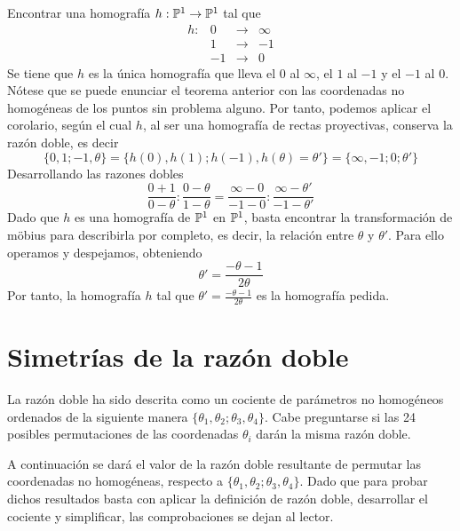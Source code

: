 \begin{exa}
	Encontrar una homografía $h:\mathbb{P}^1\rightarrow \mathbb{P}^1$ tal que 
	\begin{equation*}
		\begin{array}{cccc}
		h:&0&\rightarrow &\infty\\
		&1&\rightarrow &-1\\
		&-1&\rightarrow &0
		\end{array}
	\end{equation*}
	Se tiene que $h$ es la única homografía que lleva el $0$ al $\infty$, el $1$ al $-1$ y el $-1$ al $0$. Nótese que se puede enunciar el teorema anterior con las coordenadas no homogéneas de los puntos sin problema alguno. Por tanto, podemos aplicar el corolario, según el cual $h$, al ser una homografía de rectas proyectivas, conserva la razón doble, es decir
	\begin{equation*}
		\{0,1;-1,\theta\}=\{h(0),h(1);h(-1),h(\theta)=\theta'\}=\{\infty,-1;0;\theta'\}
	\end{equation*}
	Desarrollando las razones dobles
	\begin{equation*}
		\frac{0+1}{0-\theta}:\frac{0-\theta}{1-\theta}=\frac{\infty-0}{-1-0}:\frac{\infty-\theta'}{-1-\theta'}
	\end{equation*}
	Dado que $h$ es una homografía de $\mathbb{P}^1$ en $\mathbb{P}^1$, basta encontrar la transformación de möbius para describirla por completo, es decir, la relación entre $\theta$ y $\theta'$. Para ello operamos y despejamos, obteniendo
	\begin{equation*}
		\theta'=\frac{-\theta-1}{2\theta}
	\end{equation*}
	Por tanto, la homografía $h$ tal que $\theta'=\frac{-\theta-1}{2\theta}$ es la homografía pedida.
\end{exa}

\section{Simetrías de la razón doble}\label{C5_sec_simetrias}

La razón doble ha sido descrita como un cociente de parámetros no homogéneos ordenados de la siguiente manera $\{\theta_1,\theta_2;\theta_3,\theta_4\}$. Cabe preguntarse si las 24 posibles permutaciones de las coordenadas $\theta_i$ darán la misma razón doble.

A continuación se dará el valor de la razón doble resultante de permutar las coordenadas no homogéneas, respecto a $\{\theta_1,\theta_2;\theta_3,\theta_4\}$. Dado que para probar dichos resultados basta con aplicar la definición de razón doble, desarrollar el cociente y simplificar, las comprobaciones se dejan al lector. 

